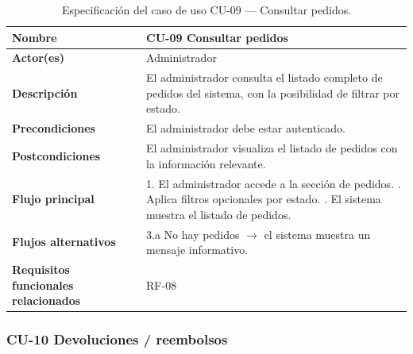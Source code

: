 \begin{table}[H]
\centering
\small
\begin{tabular}{|m{}|m{}|}
\hline
\textbf{Nombre} & CU-09 Consultar pedidos \\ \hline
\textbf{Actor(es)} & Administrador \\ \hline
\textbf{Descripción} & El administrador consulta el listado completo de pedidos del sistema, con la posibilidad de filtrar por estado. \\ \hline
\textbf{Precondiciones} & El administrador debe estar autenticado. \\ \hline
\textbf{Postcondiciones} & El administrador visualiza el listado de pedidos con la información relevante. \\ \hline
\textbf{Flujo principal} & 1. El administrador accede a la sección de pedidos. \newline 2. Aplica filtros opcionales por estado. \newline 3. El sistema muestra el listado de pedidos. \\ \hline
\textbf{Flujos alternativos} & 3.a No hay pedidos $\rightarrow$ el sistema muestra un mensaje informativo. \\ \hline
\textbf{Requisitos funcionales relacionados} & RF-08 \\ \hline
\end{tabular}
\caption{Especificación del caso de uso CU-09 — Consultar pedidos.}
\end{table}

\subsubsection{CU-10 Devoluciones / reembolsos}

